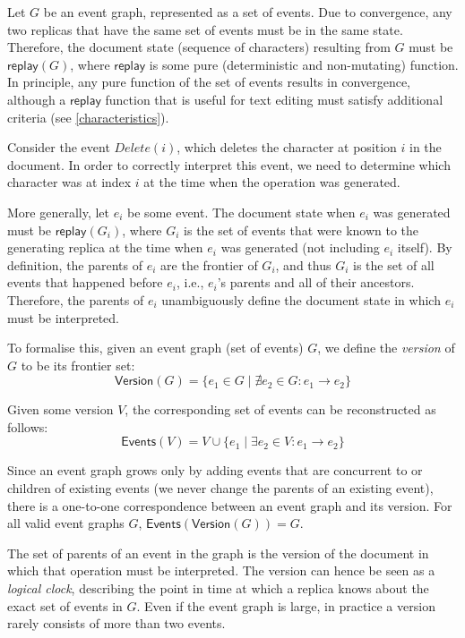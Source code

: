 \documentclass[sigplan,10pt]{acmart}
\begin{document}
Let $G$ be an event graph, represented as a set of events.
Due to convergence, any two replicas that have the same set of events must be in the same state.
Therefore, the document state (sequence of characters) resulting from $G$ must be $\mathsf{replay}(G)$, where $\mathsf{replay}$ is some pure (deterministic and non-mutating) function.
In principle, any pure function of the set of events results in convergence, although a $\mathsf{replay}$ function that is useful for text editing must satisfy additional criteria (see \autoref{characteristics}).

Consider the event $\mathit{Delete}(i)$, which deletes the character at position $i$ in the document. In order to correctly interpret this event, we need to determine which character was at index $i$ at the time when the operation was generated.

More generally, let $e_i$ be some event. The document state when $e_i$ was generated must be $\mathsf{replay}(G_i)$, where $G_i$ is the set of events that were known to the generating replica at the time when $e_i$ was generated (not including $e_i$ itself).
By definition, the parents of $e_i$ are the frontier of $G_i$, and thus $G_i$ is the set of all events that happened before $e_i$, i.e., $e_i$'s parents and all of their ancestors.
Therefore, the parents of $e_i$ unambiguously define the document state in which $e_i$ must be interpreted.

To formalise this, given an event graph (set of events) $G$, we define the \emph{version} of $G$ to be its frontier set:
\begin{equation*}
  \mathsf{Version}(G) = \{e_1 \in G \mid \nexists e_2 \in G: e_1 \rightarrow e_2\}
\end{equation*}

Given some version $V$, the corresponding set of events can be reconstructed as follows:
\begin{equation*}
  \mathsf{Events}(V) = V \cup \{e_1 \mid \exists e_2 \in V : e_1 \rightarrow e_2\}
\end{equation*}

Since an event graph grows only by adding events that are concurrent to or children of existing events (we never change the parents of an existing event), there is a one-to-one correspondence between an event graph and its version.
For all valid event graphs $G$, $\mathsf{Events}(\mathsf{Version}(G)) = G$.

The set of parents of an event in the graph is the version of the document in which that operation must be interpreted.
The version can hence be seen as a \emph{logical clock}, describing the point in time at which a replica knows about the exact set of events in $G$.
Even if the event graph is large, in practice a version rarely consists of more than two events.
\end{document}
